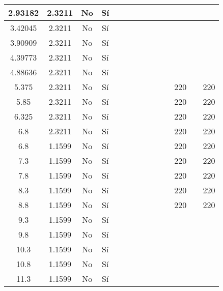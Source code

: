 \begin{table}[H]
{\begin{tabular}{|c|c|c|c|c|c|c|c|c|c|c|c|c|c|}
\hline
2.93182 & 2.3211 & No  & Sí  &     &     &     &     &     &     &     &     &     &  \bigstrut\\
\hline
3.42045 & 2.3211 & No  & Sí  &     &     &     &     &     &     &     &     &     &  \bigstrut\\
\hline
3.90909 & 2.3211 & No  & Sí  &     &     &     &     &     &     &     &     &     &  \bigstrut\\
\hline
4.39773 & 2.3211 & No  & Sí  &     &     &     &     &     &     &     &     &     &  \bigstrut\\
\hline
4.88636 & 2.3211 & No  & Sí  &     &     &     &     &     &     &     &     &     &  \bigstrut\\
\hline
5.375 & 2.3211 & No  & Sí  &     &     &     &     &     &     &     & 220 &     & 220 \bigstrut\\
\hline
5.85 & 2.3211 & No  & Sí  &     &     &     &     &     &     &     & 220 &     & 220 \bigstrut\\
\hline
6.325 & 2.3211 & No  & Sí  &     &     &     &     &     &     &     & 220 &     & 220 \bigstrut\\
\hline
6.8 & 2.3211 & No  & Sí  &     &     &     &     &     &     &     & 220 &     & 220 \bigstrut\\
\hline
6.8 & 1.1599 & No  & Sí  &     &     &     &     &     &     &     & 220 &     & 220 \bigstrut\\
\hline
7.3 & 1.1599 & No  & Sí  &     &     &     &     &     &     &     & 220 &     & 220 \bigstrut\\
\hline
7.8 & 1.1599 & No  & Sí  &     &     &     &     &     &     &     & 220 &     & 220 \bigstrut\\
\hline
8.3 & 1.1599 & No  & Sí  &     &     &     &     &     &     &     & 220 &     & 220 \bigstrut\\
\hline
8.8 & 1.1599 & No  & Sí  &     &     &     &     &     &     &     & 220 &     & 220 \bigstrut\\
\hline
9.3 & 1.1599 & No  & Sí  &     &     &     &     &     &     &     &     &     &  \bigstrut\\
\hline
9.8 & 1.1599 & No  & Sí  &     &     &     &     &     &     &     &     &     &  \bigstrut\\
\hline
10.3 & 1.1599 & No  & Sí  &     &     &     &     &     &     &     &     &     &  \bigstrut\\
\hline
10.8 & 1.1599 & No  & Sí  &     &     &     &     &     &     &     &     &     &  \bigstrut\\
\hline
11.3 & 1.1599 & No  & Sí  &     &     &     &     &     &     &     &     &     &  \bigstrut\\

\end{tabular}}
\end{table}
